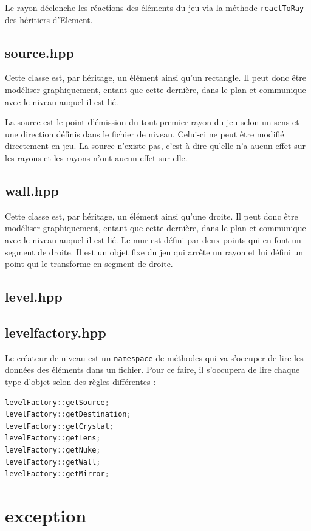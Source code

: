 \documentclass[a4paper,11pt]{report}
\begin{document}
Le rayon déclenche les réactions des éléments du jeu via la méthode
\texttt{reactToRay} des héritiers d'Element.

\subsection[Source]{source.hpp}
Cette classe est, par héritage, un élément ainsi qu'un rectangle. Il peut donc
être modéliser graphiquement, entant que cette dernière, dans le plan et
communique avec le niveau auquel il est lié. 

La source est le point d'émission du tout premier rayon du jeu selon un sens 
et une direction définis dans le fichier de niveau. Celui-ci ne peut être
modifié directement en jeu. La source n'existe pas, c'est à dire qu'elle n'a
aucun effet sur les rayons et les rayons n'ont aucun effet sur elle.

\subsection[Mur]{wall.hpp}
Cette classe est, par héritage, un élément ainsi qu'une droite. Il peut donc
être modéliser graphiquement, entant que cette dernière, dans le plan et
communique avec le niveau auquel il est lié. Le mur est défini par deux points
qui en font un segment de droite. Il est un objet fixe du jeu qui arrête un
rayon et lui défini un point qui le transforme en segment de droite.

\subsection[Niveau]{level.hpp}
\subsection[Createur de niveau]{levelfactory.hpp}
Le créateur de niveau est un \texttt{namespace} de méthodes qui va s'occuper de lire
les données des éléments dans un fichier. 
Pour ce faire, il s'occupera de lire chaque type d'objet selon des règles
différentes :
\begin{lstlisting}[frame=single,language=C++]
levelFactory::getSource;
levelFactory::getDestination;
levelFactory::getCrystal;
levelFactory::getLens;
levelFactory::getNuke;
levelFactory::getWall;
levelFactory::getMirror;
\end{lstlisting}
\section[L'exception]{exception}
\end{document}
